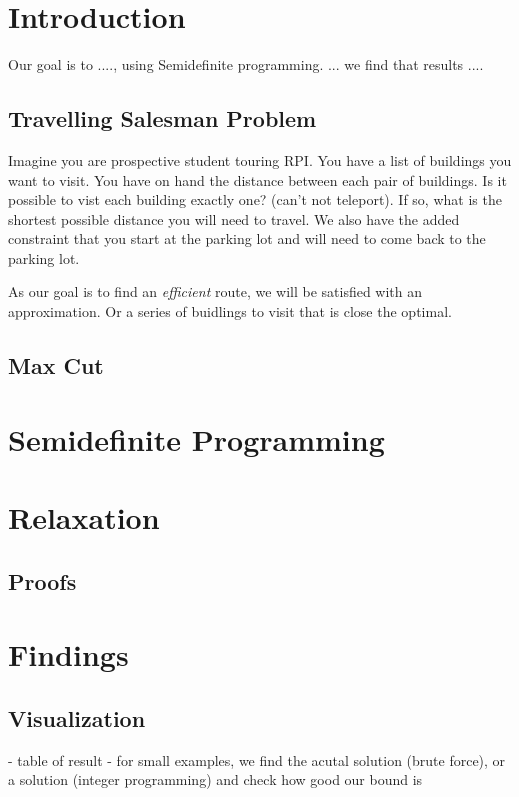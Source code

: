 \documentclass{article}
\begin{document}
\section{Introduction}

Our goal is to ...., using Semidefinite programming. ... we find that results ....

\subsection{Travelling Salesman Problem}
Imagine you are prospective student touring RPI. You have a list of buildings you want to visit.
You have on hand the distance between each pair of buildings. Is it possible to vist each building exactly one?
(can't not teleport). If so, what is the shortest possible distance you will need to travel. We also 
have the added constraint that you start at the parking lot and will need to come back to the parking lot.

As our goal is to find an \emph{efficient} route, we will be satisfied with an approximation. 
Or a series of buidlings to visit that is close the optimal.

\subsection{Max Cut}

\section{Semidefinite Programming}

\section{Relaxation}

\subsection{Proofs}

\section{Findings}
\subsection{Visualization}
- table of result
- for small examples, we find the acutal solution (brute force), or a solution (integer programming) and check how 
good our bound is
\end{document}
